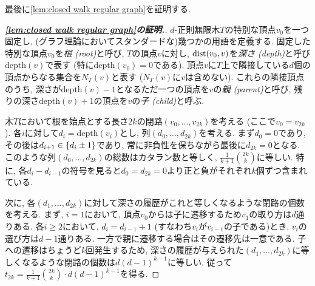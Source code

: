 最後に\cref{lem:closed walk regular graph}を証明する.
\begin{proof}[\textbf{\cref{lem:closed walk regular graph}の証明.}]
    $d$-正則無限木$T$の特別な頂点$v_0$を一つ固定し, (グラフ理論においてスタンダードな)幾つかの用語を定義する.
    固定した特別な頂点$v_0$を\emph{根 (root)}と呼び,
    $T$の頂点$v$に対し, $\mathrm{dist}(v_0,v)$を\emph{深さ (depth)}と呼び$\mathrm{depth}(v)$で表す (特に$\mathrm{depth}(v_0)=0$である).
    頂点$v$に$T$上で隣接している$d$個の頂点からなる集合を$N_T(v)$と表す ($N_T(v)$に$v$は含めない).
    これらの隣接頂点のうち, 深さが$\mathrm{depth}(v)-1$となるただ一つの頂点を$v$の\emph{親 (parent)}と呼び,
    残りの深さ$\mathrm{depth}(v)+1$の頂点を$v$の\emph{子 (child)}と呼ぶ.

    木$T$において根を始点とする長さ$2k$の閉路$(v_0,\dots,v_{2k})$を考える (ここで$v_0=v_{2k}$).
    各$i$に対して$d_i = \mathrm{depth}(v_i)$とし, 列$(d_0,\dots,d_{2k})$を考える.
    まず$d_0=0$であり, その後は$d_{i+1} \in \lbrace d_i \pm 1\rbrace$であり, 常に非負性を保ちながら最後に$d_{2k}=0$となる.
    このような列$(d_0,\dots,d_{2k})$の総数はカタラン数と等しく, $\frac{1}{k+1}\binom{2k}{k}$に等しい.
    特に, 各$d_i - d_{i-1}$の符号を見ると$d_0 = d_{2k} = 0$より正と負がそれぞれ$k$個ずつ含まれている.

    次に, 各$(d_1,\dots,d_{2k})$に対して深さの履歴がこれと等しくなるような閉路の個数を考える.
    まず, $i=1$において, 頂点$v_0$からは子に遷移するため$v_1$の取り方は$d$通りある.
    各$i\ge 2$において, $d_i=d_{i-1}+1$ (すなわち$v_i$が$v_{i-1}$の子である)とき, $v_i$の選び方は$d-1$通りある.
    一方で親に遷移する場合はその遷移先は一意である.
    子への遷移はちょうど$k$回発生するため, 深さの履歴が与えられた$(d_1,\dots,d_{2k})$に等しくなるような閉路の個数は$d(d-1)^{k-1}$に等しい.
    従って$t_{2k} = \frac{1}{k+1}\binom{2k}{k} \cdot d(d-1)^{k-1}$を得る.


\end{proof}
